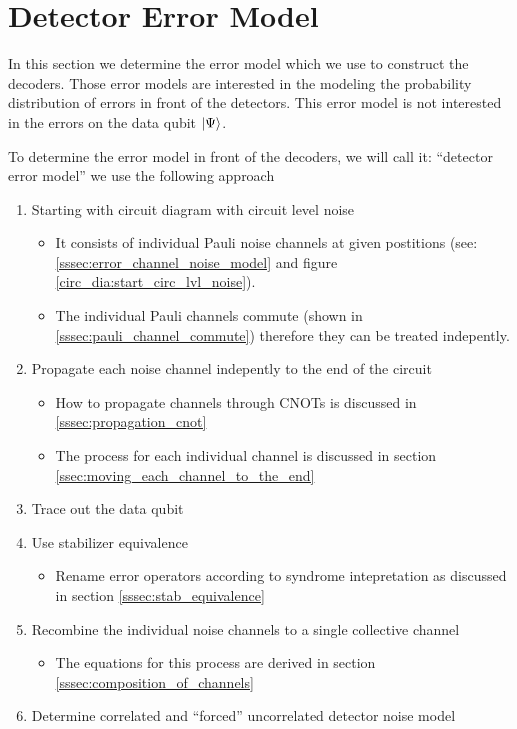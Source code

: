 \section{Detector Error Model}

In this section we determine the error model which we use to construct the decoders. 
Those error models are interested in the modeling the probability distribution of errors in front of the detectors.
This error model is not interested in the errors on the data qubit $\ket{\Psi}$. 

To determine the error model in front of the decoders, we will call it: \enquote{detector error model} we use the following approach
\begin{enumerate}
    \item Starting with circuit diagram with circuit level noise 
    \begin{itemize}
        \item It consists of individual Pauli noise channels at given postitions (see: \ref{sssec:error_channel_noise_model} and figure \ref{circ_dia:start_circ_lvl_noise}).
        \item The individual Pauli channels commute (shown in \ref{sssec:pauli_channel_commute}) therefore they can be treated indepently. 
    \end{itemize}
    \item Propagate each noise channel indepently to the end of the circuit
    \begin{itemize}
        \item How to propagate channels through CNOTs is discussed in \ref{sssec:propagation_cnot}
        \item The process for each individual channel is discussed in section \ref{ssec:moving_each_channel_to_the_end}
    \end{itemize}
    \item Trace out the data qubit
    \item Use stabilizer equivalence 
    \begin{itemize}
        \item Rename error operators according to syndrome intepretation as discussed in section \ref{sssec:stab_equivalence}
    \end{itemize}
    \item Recombine the individual noise channels to a single collective channel 
    \begin{itemize}
        \item The equations for this process are derived in section \ref{sssec:composition_of_channels}
    \end{itemize}
    \item Determine correlated and \enquote{forced} uncorrelated detector noise model 
\end{enumerate}

